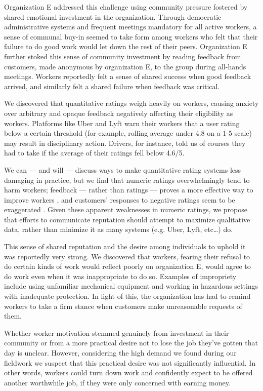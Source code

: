 Organization E addressed this challenge using community pressure fostered by shared emotional investment in the organization.
Through democratic administrative systems and frequent meetings mandatory for all active workers, a sense of communal buy-in seemed to take form among workers who felt that their failure to do good work would let down the rest of their peers.
Organization E further stoked this sense of community investment by reading feedback from customers, made anonymous by organization E, to the group during all-hands meetings.
Workers reportedly felt a sense of shared success when good feedback arrived, and similarly felt a shared failure when feedback was critical.

We discovered that quantitative ratings weigh heavily on workers,
causing anxiety over arbitrary and opaque feedback negatively affecting their eligibility as workers.
Platforms like Uber and Lyft warn their workers that a user rating below a certain threshold
(for example, rolling average under 4.8 on a 1-5 scale) may result in disciplinary action.
Drivers, for instance, told us of courses they had to take if the average of their ratings fell below 4.6/5.

We can --- and will --- discuss ways to make quantitative rating systems less damaging in practice,
but we find that numeric ratings overwhelmingly tend to harm workers;
feedback --- rather than ratings --- proves a more effective way to improve workers
\cite{numericCritique},
and customers' responses to negative ratings seem to be exaggerated
\cite{ebayRatings}.
Given these apparent weaknesses in numeric ratings, we propose that efforts to communicate reputation should attempt to maximize qualitative data, rather than minimize it as many systems (e.g. Uber, Lyft, etc\dots) do.

This sense of shared reputation and the desire among individuals to uphold it was reportedly very strong.
We discovered that workers, fearing their refusal to do certain kinds of work would reflect poorly on organization E, would agree to do work even when it was inappropriate to do so.
Examples of impropriety include using unfamiliar mechanical equipment and working in hazardous settings with inadequate protection.
In light of this, the organization has had to remind workers to take a firm stance when customers make unreasonable requests of them.

Whether worker motivation stemmed genuinely from investment in their community
or from a more practical desire not to lose the job they've gotten that day is unclear.
However, considering the high demand we found during our fieldwork
we suspect that this practical desire was not significantly influential.
In other words,
workers could turn down work and confidently expect to be offered another worthwhile job,
if they were only concerned with earning money.